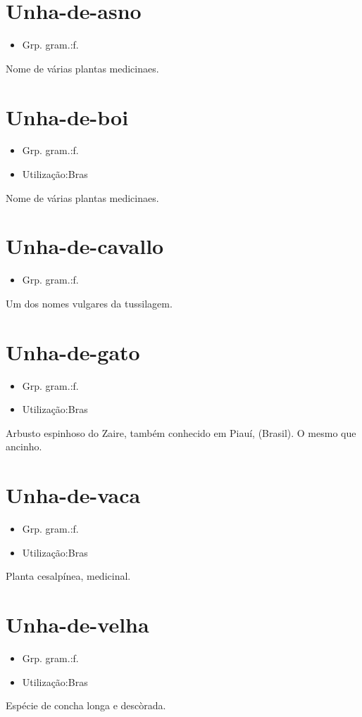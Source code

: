 \documentclass{article}
\begin{document}
\section{Unha-de-asno}
\begin{itemize}
\item {Grp. gram.:f.}
\end{itemize}
Nome de várias plantas medicinaes.
\section{Unha-de-boi}
\begin{itemize}
\item {Grp. gram.:f.}
\end{itemize}
\begin{itemize}
\item {Utilização:Bras}
\end{itemize}
Nome de várias plantas medicinaes.
\section{Unha-de-cavallo}
\begin{itemize}
\item {Grp. gram.:f.}
\end{itemize}
Um dos nomes vulgares da tussilagem.
\section{Unha-de-gato}
\begin{itemize}
\item {Grp. gram.:f.}
\end{itemize}
\begin{itemize}
\item {Utilização:Bras}
\end{itemize}
Arbusto espinhoso do Zaire, também conhecido em Piauí, (Brasil).
O mesmo que \textunderscore ancinho\textunderscore .
\section{Unha-de-vaca}
\begin{itemize}
\item {Grp. gram.:f.}
\end{itemize}
\begin{itemize}
\item {Utilização:Bras}
\end{itemize}
Planta cesalpínea, medicinal.
\section{Unha-de-velha}
\begin{itemize}
\item {Grp. gram.:f.}
\end{itemize}
\begin{itemize}
\item {Utilização:Bras}
\end{itemize}
Espécie de concha longa e descòrada.
\end{document}
